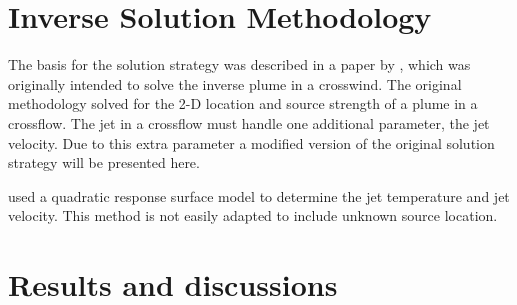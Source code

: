 \documentclass[preprint,12pt]{elsarticle}
\begin{document}
\section{Inverse Solution Methodology}
The basis for the solution strategy was described in a paper by \citet{ijhmt1}, which was originally intended to solve the inverse plume in a crosswind.  The original methodology solved for the 2-D location and source strength of a plume in a crossflow.  The jet in a crossflow must handle one additional parameter, the jet velocity.  Due to this extra parameter a modified version of the original solution strategy will be presented here.

 used a quadratic response surface model to determine the jet temperature and jet velocity.  This method is not easily adapted to include unknown source location.





\section{Results and discussions}
\end{document}
